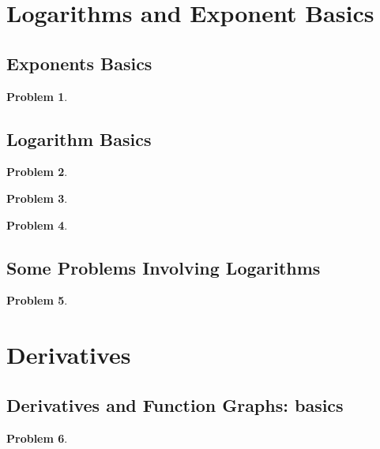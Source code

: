\documentclass{article}
\newtheorem{problem}{Problem}
\begin{document}
\section{Logarithms and Exponent Basics}\label{secMPSLogarithmsExponentsBasics}
\subsection{Exponents Basics}
\begin{problem}

\end{problem}


\subsection{Logarithm Basics}
\begin{problem}

\end{problem}

\begin{problem}

\end{problem}

\begin{problem}

\end{problem}




\subsection{Some Problems Involving Logarithms}
\begin{problem}

\end{problem}





\section{Derivatives}
\subsection{Derivatives and Function Graphs: basics}\label{secMPSderivativesFunGraphsBasics}
\begin{problem}

\end{problem}
\end{document}
